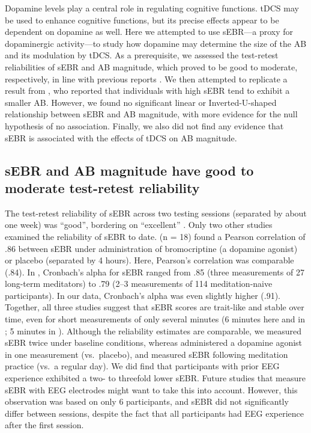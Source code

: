 \documentclass[11pt,english,]{memoir}
\begin{document}
Dopamine levels play a central role in regulating cognitive functions. tDCS may be used to enhance cognitive functions, but its precise effects appear to be dependent on dopamine as well. Here we attempted to use sEBR---a proxy for dopaminergic activity---to study how dopamine may determine the size of the AB and its modulation by tDCS. As a prerequisite, we assessed the test-retest reliabilities of sEBR and AB magnitude, which proved to be good to moderate, respectively, in line with previous reports \autocites{Kruis2016}{Dang2017}{Dale2013}. We then attempted to replicate a result from \textcite{Colzato2008}, who reported that individuals with high sEBR tend to exhibit a smaller AB. However, we found no significant linear or Inverted-U-shaped relationship between sEBR and AB magnitude, with more evidence for the null hypothesis of no association. Finally, we also did not find any evidence that sEBR is associated with the effects of tDCS on AB magnitude.

\hypertarget{sebr-and-ab-magnitude-have-good-to-moderate-test-retest-reliability}{%
\subsection{sEBR and AB magnitude have good to moderate test-retest reliability}\label{sebr-and-ab-magnitude-have-good-to-moderate-test-retest-reliability}}

The test-retest reliability of sEBR across two testing sessions (separated by about one week) was ``good'', bordering on ``excellent'' \autocite{Koo2016}. Only two other studies examined the reliability of sEBR to date. \textcite{Dang2017} (n = 18) found a Pearson correlation of .86 between sEBR under administration of bromocriptine (a dopamine agonist) or placebo (separated by 4 hours). Here, Pearson's correlation was comparable (.84). In \textcite{Kruis2016}, Cronbach's alpha for sEBR ranged from .85 (three measurements of 27 long-term meditators) to .79 (2--3 measurements of 114 meditation-naive participants). In our data, Cronbach's alpha was even slightly higher (.91). Together, all three studies suggest that sEBR scores are trait-like and stable over time, even for short measurements of only several minutes (6 minutes here and in \textcite{Kruis2016}; 5 minutes in \textcite{Dang2017}). Although the reliability estimates are comparable, we measured sEBR twice under baseline conditions, whereas \textcite{Dang2017} administered a dopamine agonist in one measurement (vs.~placebo), and \textcite{Kruis2016} measured sEBR following meditation practice (vs.~a regular day). We did find that participants with prior EEG experience exhibited a two- to threefold lower sEBR. Future studies that measure sEBR with EEG electrodes might want to take this into account. However, this observation was based on only 6 participants, and sEBR did not significantly differ between sessions, despite the fact that all participants had EEG experience after the first session.
\end{document}
